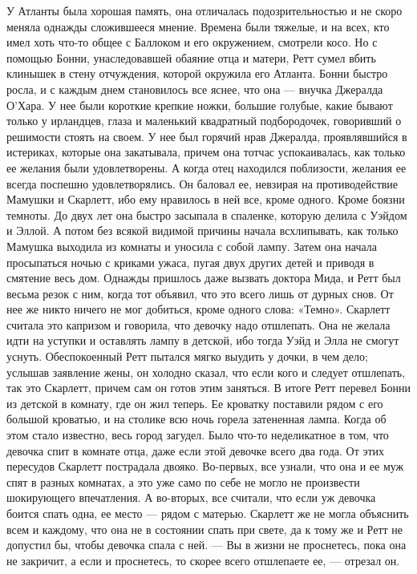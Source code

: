 У Атланты была хорошая память, она отличалась подозрительностью и не скоро меняла однажды сложившееся мнение. Времена были тяжелые, и на всех, кто имел хоть что-то общее с Баллоком и его окружением, смотрели косо. Но с помощью Бонни, унаследовавшей обаяние отца и матери, Ретт сумел вбить клинышек в стену отчуждения, которой окружила его Атланта.
Бонни быстро росла, и с каждым днем становилось все яснее, что она — внучка Джералда О’Хара. У нее были короткие крепкие ножки, большие голубые, какие бывают только у ирландцев, глаза и маленький квадратный подбородочек, говоривший о решимости стоять на своем. У нее был горячий нрав Джералда, проявлявшийся в истериках, которые она закатывала, причем она тотчас успокаивалась, как только ее желания были удовлетворены. А когда отец находился поблизости, желания ее всегда поспешно удовлетворялись. Он баловал ее, невзирая на противодействие Мамушки и Скарлетт, ибо ему нравилось в ней все, кроме одного. Кроме боязни темноты.
До двух лет она быстро засыпала в спаленке, которую делила с Уэйдом и Эллой. А потом без всякой видимой причины начала всхлипывать, как только Мамушка выходила из комнаты и уносила с собой лампу. Затем она начала просыпаться ночью с криками ужаса, пугая двух других детей и приводя в смятение весь дом. Однажды пришлось даже вызвать доктора Мида, и Ретт был весьма резок с ним, когда тот объявил, что это всего лишь от дурных снов. От нее же никто ничего не мог добиться, кроме одного слова: «Темно».
Скарлетт считала это капризом и говорила, что девочку надо отшлепать. Она не желала идти на уступки и оставлять лампу в детской, ибо тогда Уэйд и Элла не смогут уснуть. Обеспокоенный Ретт пытался мягко выудить у дочки, в чем дело; услышав заявление жены, он холодно сказал, что если кого и следует отшлепать, так это Скарлетт, причем сам он готов этим заняться.
В итоге Ретт перевел Бонни из детской в комнату, где он жил теперь. Ее кроватку поставили рядом с его большой кроватью, и на столике всю ночь горела затененная лампа. Когда об этом стало известно, весь город загудел. Было что-то неделикатное в том, что девочка спит в комнате отца, даже если этой девочке всего два года. От этих пересудов Скарлетт пострадала двояко. Во-первых, все узнали, что она и ее муж спят в разных комнатах, а это уже само по себе не могло не произвести шокирующего впечатления. А во-вторых, все считали, что если уж девочка боится спать одна, ее место — рядом с матерью. Скарлетт же не могла объяснить всем и каждому, что она не в состоянии спать при свете, да к тому же и Ретт не допустил бы, чтобы девочка спала с ней.
— Вы в жизни не проснетесь, пока она не закричит, а если и проснетесь, то скорее всего отшлепаете ее, — отрезал он.
